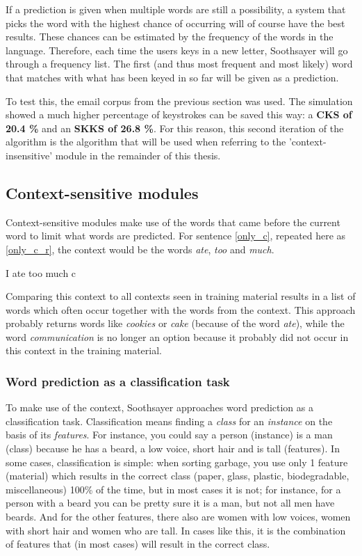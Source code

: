 \documentclass[11pt]{article}
\begin{document}
If a prediction is given when multiple words are still a possibility, a system that picks the word with the highest chance of occurring will of course have the best results. These chances can be estimated by the frequency of the words in the language. Therefore, each time the users keys in a new letter, Soothsayer will go through a frequency list. The first (and thus most frequent and most likely) word that matches with what has been keyed in so far will be given as a prediction.

To test this, the email corpus from the previous section was used. The simulation showed a much higher percentage of keystrokes can be saved this way: a \textbf{CKS of 20.4 \%} and an \textbf{SKKS of 26.8 \%}. For this reason, this second iteration of the algorithm is the algorithm that will be used when referring to the 'context-insensitive' module in the remainder of this thesis.

\subsection{Context-sensitive modules} \label{cs}

Context-sensitive modules make use of the words that came before the current word to limit what words are predicted. For sentence \ref{only_c}, repeated here as \ref{only_c_r}, the context would be the words \emph{ate}, \emph{too} and \emph{much}.

\begin{examples}
\item I ate too much c \label{only_c_r}
\end{examples}

Comparing this context to all contexts seen in training material results in a list of words which often occur together with the words from the context. This approach probably returns words like \emph{cookies} or \emph{cake} (because of the word \emph{ate}), while the word \emph{communication} is no longer an option because it probably did not occur in this context in the training material.

\subsubsection{Word prediction as a classification task}

To make use of the context, Soothsayer approaches word prediction as a classification task. Classification means finding a \emph{class} for an \emph{instance} on the basis of its \emph{features}. For instance, you could say a person (instance) is a man (class) because he has a beard, a low voice, short hair and is tall (features). In some cases, classification is simple: when sorting garbage, you use only 1 feature (material) which results in the correct class (paper, glass, plastic, biodegradable, miscellaneous) 100\% of the time, but in most cases it is not; for instance, for a person with a beard you can be pretty sure it is a man, but not all men have beards. And for the other features, there also are women with low voices, women with short hair and women who are tall. In cases like this, it is the combination of features that (in most cases) will result in the correct class.
\end{document}
